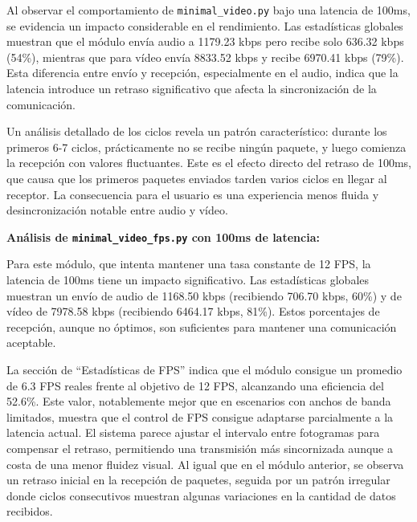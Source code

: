 Al observar el comportamiento de \texttt{minimal\_video.py} bajo una latencia de 100ms, se evidencia un impacto considerable en el rendimiento. Las estadísticas globales muestran que el módulo envía audio a 1179.23 kbps pero recibe solo 636.32 kbps (54\%), mientras que para vídeo envía 8833.52 kbps y recibe 6970.41 kbps (79\%). Esta diferencia entre envío y recepción, especialmente en el audio, indica que la latencia introduce un retraso significativo que afecta la sincronización de la comunicación.
\vspace{\baselineskip}

Un análisis detallado de los ciclos revela un patrón característico: durante los primeros 6-7 ciclos, prácticamente no se recibe ningún paquete, y luego comienza la recepción con valores fluctuantes. Este es el efecto directo del retraso de 100ms, que causa que los primeros paquetes enviados tarden varios ciclos en llegar al receptor. La consecuencia para el usuario es una experiencia menos fluida y desincronización notable entre audio y vídeo.

\vspace{\baselineskip}

\textbf{Análisis de \texttt{minimal\_video\_fps.py} con 100ms de latencia:}
\vspace{\baselineskip}

Para este módulo, que intenta mantener una tasa constante de 12 FPS, la latencia de 100ms tiene un impacto significativo. Las estadísticas globales muestran un envío de audio de 1168.50 kbps (recibiendo 706.70 kbps, 60\%) y de vídeo de 7978.58 kbps (recibiendo 6464.17 kbps, 81\%). Estos porcentajes de recepción, aunque no óptimos, son suficientes para mantener una comunicación aceptable.
\vspace{\baselineskip}

La sección de ``Estadísticas de FPS'' indica que el módulo consigue un promedio de 6.3 FPS reales frente al objetivo de 12 FPS, alcanzando una eficiencia del 52.6\%. Este valor, notablemente mejor que en escenarios con anchos de banda limitados, muestra que el control de FPS consigue adaptarse parcialmente a la latencia actual. El sistema parece ajustar el intervalo entre fotogramas para compensar el retraso, permitiendo una transmisión más sincornizada aunque a costa de una menor fluidez visual. Al igual que en el módulo anterior, se observa un retraso inicial en la recepción de paquetes, seguida por un patrón irregular donde ciclos consecutivos muestran algunas variaciones en la cantidad de datos recibidos.


